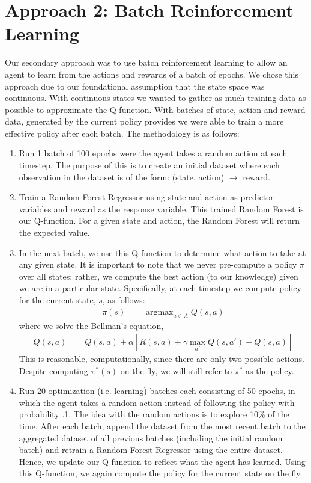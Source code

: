 \documentclass[11pt, oneside]{article}   	%
\DeclareMathOperator*{\argmax}{argmax} %
\begin{document}
\section{Approach 2: Batch Reinforcement Learning}
Our secondary approach was to use batch reinforcement learning to allow an agent to learn from the actions and rewards of a batch of epochs. We chose this approach due to our foundational assumption that the state space was continuous. With continuous states we wanted to gather as much training data as possible to approximate the Q-function. With batches of state, action and reward data, generated by the current policy provides we were able to train a more effective policy after each batch. The methodology is as follows:
\begin{enumerate}
  \item Run 1 batch of 100 epochs were the agent takes a random action at each timestep.  The purpose of this is to create an initial dataset where each observation in the dataset is of the form: (state, action) $\longrightarrow$ reward.
  \item Train a Random Forest Regressor using state and action as predictor variables and reward as the response variable.  This trained Random Forest is our Q-function.  For a given state and action, the Random Forest will return the expected value.
  \item In the next batch, we use this Q-function to determine what action to take at any given state.  It is important to note that we never pre-compute a policy $\pi$ over all states; rather, we compute the best action (to our knowledge) given we are in a particular state.  Specifically, at each timestep we compute policy for the current state, $s$, as follows:
\begin{align}
\pi(s) &= \argmax_{a\in A} Q(s,a)
\end{align}
where we solve the Bellman's equation, 
\begin{align}
Q(s,a) &= Q(s,a) + \alpha\left[R(s,a) + \gamma \max_{a'} Q(s,a') - Q(s,a)\right]
\end{align}
This is reasonable, computationally, since there are only two possible actions.  Despite computing $\pi^*(s)$ on-the-fly, we will still refer to $\pi^*$ as the policy.
  \item Run 20 optimization (i.e. learning) batches each consisting of 50 epochs, in which the agent takes a random action instead of following the policy with probability .1. The idea with the random actions is to explore 10\% of the time.  After each batch, append the dataset from the most recent batch to the aggregated dataset of all previous batches (including the initial random batch) and retrain a Random Forest Regressor using the entire dataset.  Hence, we update our Q-function to reflect what the agent has learned.  Using this Q-function, we again compute the policy for the current state on the fly.
  

\end{enumerate}
\end{document}
